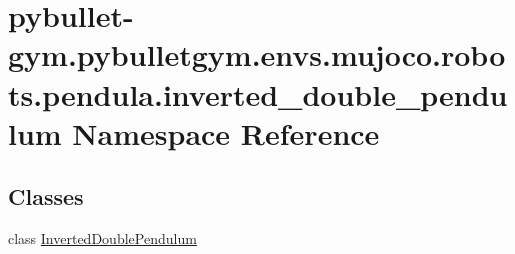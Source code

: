 \hypertarget{namespacepybullet-gym_1_1pybulletgym_1_1envs_1_1mujoco_1_1robots_1_1pendula_1_1inverted__double__pendulum}{}\section{pybullet-\/gym.pybulletgym.\+envs.\+mujoco.\+robots.\+pendula.\+inverted\+\_\+double\+\_\+pendulum Namespace Reference}
\label{namespacepybullet-gym_1_1pybulletgym_1_1envs_1_1mujoco_1_1robots_1_1pendula_1_1inverted__double__pendulum}
\subsection*{Classes}
\begin{DoxyCompactItemize}
\item 
class \hyperlink{classpybullet-gym_1_1pybulletgym_1_1envs_1_1mujoco_1_1robots_1_1pendula_1_1inverted__double__penb7cabeef1e6b20f22de17739c38bbed3}{Inverted\+Double\+Pendulum}
\end{DoxyCompactItemize}
